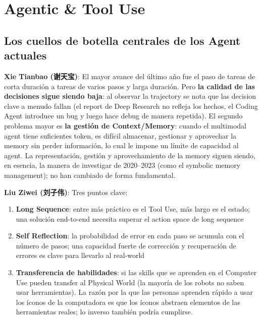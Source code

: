 \section{Agentic \& Tool Use}

\subsection{Los cuellos de botella centrales de los Agent actuales}

\textbf{Xie Tianbao (谢天宝)}: El mayor avance del último año fue el paso de tareas de corta duración a tareas de varios pasos y larga duración. Pero \textbf{la calidad de las decisiones sigue siendo baja}: al observar la trajectory se nota que las decision clave a menudo fallan (el report de Deep Research no refleja los hechos, el Coding Agent introduce un bug y luego hace debug de manera repetida). El segundo problema mayor es \textbf{la gestión de Context/Memory}: cuando el multimodal agent tiene suficientes token, es difícil almacenar, gestionar y aprovechar la memory sin perder información, lo cual le impone un límite de capacidad al agent. La representación, gestión y aprovechamiento de la memory siguen siendo, en esencia, la manera de investigar de 2020--2023 (como el symbolic memory management); no han cambiado de forma fundamental.

\textbf{Liu Ziwei (刘子伟)}: Tres puntos clave:
\begin{enumerate}
  \item \textbf{Long Sequence}: entre más práctico es el Tool Use, más largo es el estado; una solución end-to-end necesita superar el action space de long sequence
  \item \textbf{Self Reflection}: la probabilidad de error en cada paso se acumula con el número de pasos; una capacidad fuerte de corrección y recuperación de errores es clave para llevarlo al real-world
  \item \textbf{Transferencia de habilidades}: si las skills que se aprenden en el Computer Use pueden transfer al Physical World (la mayoría de los robots no saben usar herramientas). La razón por la que las personas aprenden rápido a usar los íconos de la computadora es que los íconos abstraen elementos de las herramientas reales; lo inverso también podría cumplirse.
\end{enumerate}

